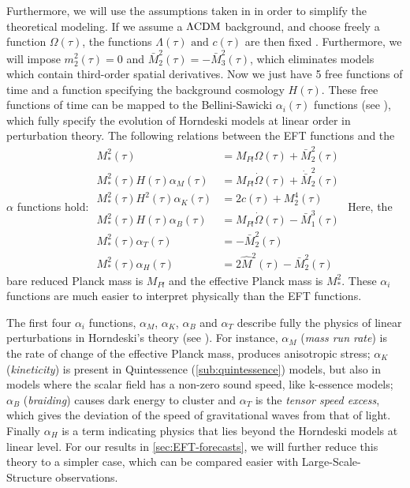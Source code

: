 Furthermore, we will use the assumptions taken in \cite{planck_collaboration_planck_2016} in order to simplify
the theoretical modeling.
If we assume a $\Lambda\mathrm{CDM}$ background, and choose freely a function
$\Omega(\tau)$, the functions $\Lambda(\tau) \textrm{ and } c(\tau)$ are then fixed \cite{hu_effective_2014}.
Furthermore, we will impose $ m^2_2(\tau) = 0$ and $ \bar{M}_2^2 (\tau) = - \bar{M}_3^2 (\tau)$,
which eliminates models which contain third-order spatial derivatives.
Now we just have 5 free functions of time and a function specifying the background cosmology $H(\tau)$.
These free functions of time can be mapped to the Bellini-Sawicki $\alpha_i (\tau)$ 
functions (see \cite{bellini_maximal_2014}),
which fully specify the evolution of Horndeski models at linear order in perturbation theory. The following relations between the EFT functions and the $\alpha$ functions hold:
\beeqal$ \label{eq:EFT-funcs}
\begin{split}
M_{*}^2 (\tau) & = M_{Pl}\Omega(\tau) + \bar{M}_2^2 (\tau) \\
M_{*}^2 (\tau) H(\tau) \alpha_M (\tau)   & = M_{Pl}\dot{\Omega}(\tau) + \dot{\bar{M}}_2^2 (\tau) \\
M_{*}^2 (\tau) H^2(\tau) \alpha_K (\tau)   & = 2 c (\tau) + M_2^4 (\tau) \\
M_{*}^2 (\tau) H(\tau) \alpha_B (\tau)   & = M_{Pl}\dot{\Omega}(\tau) - \bar{M}_{1}^3 (\tau)\\
M_{*}^2 (\tau) \alpha_T (\tau)   & = - \bar{M}_2^2 (\tau) \\
M_{*}^2 (\tau) \alpha_H (\tau)   & = 2 \hat{M}^2(\tau) - \bar{M}_2^2 (\tau)
\end{split}
$ 
Here, the bare reduced Planck mass is $M_{Pl}$ and the effective Planck mass is $ M_{*}^2 $.
These $\alpha_i$ functions are much easier to interpret physically than the EFT functions.

The first four $\alpha_i$ functions, $\alpha_M$, $\alpha_K$,
$\alpha_B$ and $\alpha_T$  describe fully the physics
of linear perturbations in Horndeski's theory (see \cite{bellini_maximal_2014}).
For instance, $\alpha_M$ (\emph{mass run rate}) is the rate of change of the effective Planck mass, 
produces anisotropic stress; $\alpha_K$ (\emph{kineticity}) is present in Quintessence (\cref{sub:quintessence}) models, 
but also in models where the scalar field has a non-zero sound speed, like k-essence models;
$\alpha_B$ (\emph{braiding}) causes dark energy to cluster and $\alpha_T$ is the \emph{tensor speed excess}, which gives the deviation
of the speed of gravitational waves from that of light.
Finally $\alpha_H$ is a term indicating physics that lies beyond the Horndeski models at linear level. 
For our results in \cref{sec:EFT-forecasts}, we will further reduce this theory to a simpler case, 
which can be compared easier with Large-Scale-Structure observations.


